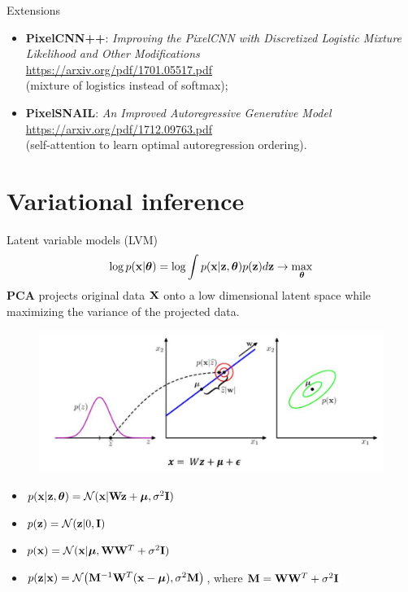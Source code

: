 \begin{frame}{Extensions}
\begin{itemize}
	\item \textbf{PixelCNN++}: \textit{Improving the PixelCNN with Discretized Logistic Mixture Likelihood and Other Modifications} \\
	\href{https://arxiv.org/pdf/1701.05517.pdf}{https://arxiv.org/pdf/1701.05517.pdf} \\
	(mixture of logistics instead of softmax);
	\item \textbf{PixelSNAIL}: \textit{An Improved Autoregressive Generative Model} \\
	\href{https://arxiv.org/pdf/1712.09763.pdf}{https://arxiv.org/pdf/1712.09763.pdf} \\
	(self-attention to learn optimal autoregression ordering).
\end{itemize}
\end{frame}
\section{Variational inference}
\begin{frame}{Latent variable models (LVM)}
	\[
	\log p(\mathbf{x} | \boldsymbol{\theta}) = \log \int p(\mathbf{x} | \mathbf{z}, \boldsymbol{\theta}) p(\mathbf{z}) d\mathbf{z} \rightarrow \max_{\boldsymbol{\theta}}
	\]
	\textbf{PCA} projects original data $\mathbf{X}$ onto a low dimensional latent space while maximizing the variance of the projected data. 
	\begin{figure}
		\centering
		\includegraphics[width=.7\linewidth]{figs/bayesian_pca}
	\end{figure}
	\vspace{-0.5cm}
	\begin{itemize}
		\item $p(\mathbf{x} | \mathbf{z}, \boldsymbol{\theta}) = \mathcal{N}(\mathbf{x} | \mathbf{W} \mathbf{z} + \boldsymbol{\mu}, \sigma^2 \mathbf{I})$
		\item $p(\mathbf{z}) = \mathcal{N}(\mathbf{z} | 0, \mathbf{I})$
		\item $p(\mathbf{x}) = \mathcal{N}(\mathbf{x} | \boldsymbol{\mu}, \mathbf{W} \mathbf{W}^T + \sigma^2 \mathbf{I})$
		\item $p(\mathbf{z} | \mathbf{x}) = \mathcal{N} \bigl(\mathbf{M}^{-1} \mathbf{W}^T (\mathbf{x} - \boldsymbol{\mu}), \sigma^2 \mathbf{M}\bigr)$, where $\mathbf{M} = \mathbf{W} \mathbf{W}^T + \sigma^2 \mathbf{I}$
	\end{itemize}
\end{frame}
